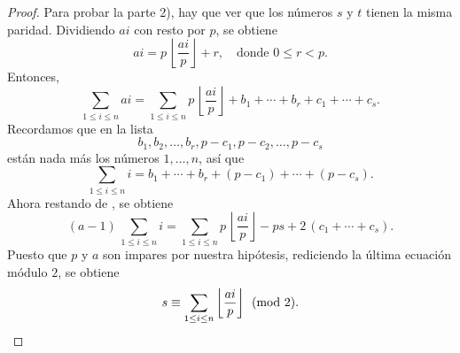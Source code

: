 \documentclass{article}
\theoremstyle{plain}
\begin{document}
\begin{lema}
\begin{proof}
    \vspace{1em}

    Para probar la parte 2), hay que ver que los números $s$ y $t$ tienen la
    misma paridad. Dividiendo $ai$ con resto por $p$, se obtiene
    $$ai = p\,\left\lfloor\frac{ai}{p}\right\rfloor + r, \quad\text{donde }0 \le r < p.$$
    Entonces,
    \begin{equation}
      \label{eqn:lema-para-la-reciprocidad-1}
      \sum_{1 \le i \le n} ai = \sum_{1 \le i \le n} p\,\left\lfloor\frac{ai}{p}\right\rfloor + b_1 + \cdots + b_r + c_1 + \cdots + c_s.
    \end{equation}
    Recordamos que en la lista
    $$b_1, b_2, \ldots, b_r, p-c_1, p-c_2, \ldots, p-c_s$$
    están nada más los números $1, \ldots, n$, así que
    \begin{equation}
      \label{eqn:lema-para-la-reciprocidad-2}
      \sum_{1 \le i \le n} i = b_1 + \cdots + b_r + (p-c_1) + \cdots+ (p-c_s).
    \end{equation}
    Ahora restando  de
    , se obtiene
    $$(a-1)\,\sum_{1\le i \le n} i = \sum_{1 \le i \le n} p\,\left\lfloor\frac{ai}{p}\right\rfloor - ps + 2\,(c_1 + \cdots + c_s).$$
    Puesto que $p$ y $a$ son impares por nuestra hipótesis, rediciendo la última
    ecuación módulo $2$, se obtiene
    \[ s \equiv \sum_{1 \le i \le n} \left\lfloor\frac{ai}{p}\right\rfloor
      \pmod{2}. \qedhere \]
  \end{proof}
\end{lema}
\end{document}
